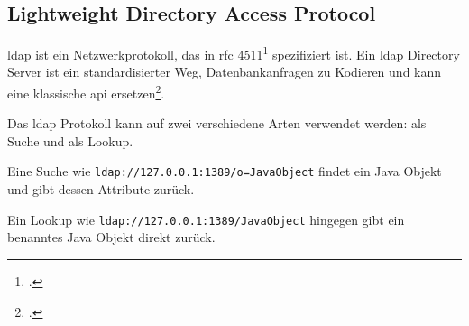 
\subsection{Lightweight Directory Access Protocol}\label{subsec:ldap}
\gls{ldap} ist ein Netzwerkprotokoll, das in \gls{rfc} 4511\footcite{rfc4511} spezifiziert ist.
Ein \gls{ldap} Directory Server ist ein standardisierter Weg, Datenbankanfragen zu Kodieren und kann eine klassische \gls{api} ersetzen\footcite{ldapWebsite}.

Das \gls{ldap} Protokoll kann auf zwei verschiedene Arten verwendet werden: als Suche und als Lookup.

Eine Suche wie \verb|ldap://127.0.0.1:1389/o=JavaObject| findet ein Java Objekt und gibt dessen Attribute zurück.

Ein Lookup wie \verb|ldap://127.0.0.1:1389/JavaObject| hingegen gibt ein benanntes Java Objekt direkt zurück.
